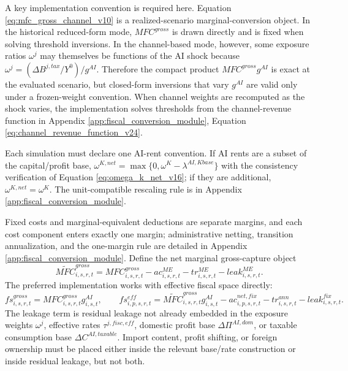 \documentclass[11pt,a4paper]{article}
\begin{document}
A key implementation convention is required here. Equation \eqref{eq:mfc_gross_channel_v10} is a realized-scenario marginal-conversion object. In the historical reduced-form mode, $MFC^{gross}$ is drawn directly and is fixed when solving threshold inversions. In the channel-based mode, however, some exposure ratios $\omega^j$ may themselves be functions of the AI shock because $\omega^j=(\Delta B^{j,tax}/Y^0)/g^{AI}$. Therefore the compact product $MFC^{gross}g^{AI}$ is exact at the evaluated scenario, but closed-form inversions that vary $g^{AI}$ are valid only under a frozen-weight convention. When channel weights are recomputed as the shock varies, the implementation solves thresholds from the channel-revenue function in Appendix \ref{app:fiscal_conversion_module}, Equation \eqref{eq:channel_revenue_function_v24}.

Each simulation must declare one AI-rent convention. If AI rents are a subset of the capital/profit base, $\omega^{K,net}=\max\{0,\omega^K-\lambda^{AI,Kbase}\}$ with the consistency verification of Equation \eqref{eq:omega_k_net_v16}; if they are additional, $\omega^{K,net}=\omega^K$. The unit-compatible rescaling rule is in Appendix \ref{app:fiscal_conversion_module}.

Fixed costs and marginal-equivalent deductions are separate margins, and each cost component enters exactly one margin; administrative netting, transition annualization, and the one-margin rule are detailed in Appendix \ref{app:fiscal_conversion_module}. Define the net marginal gross-capture object
\begin{equation}\label{eq:mfc_tilde_v17}
    \widetilde{MFC}^{gross}_{i,s,r,t}
    =MFC^{gross}_{i,s,r,t}-ac^{ME}_{i,s,r,t}-tr^{ME}_{i,s,r,t}-leak^{ME}_{i,s,r,t}.
\end{equation}
The preferred implementation works with effective fiscal space directly:
\begin{equation}\label{eq:fs_gross_eff_v21}
    fs^{gross}_{i,s,r,t}=MFC^{gross}_{i,s,r,t}g^{AI}_{i,s,t},
    \qquad
    fs^{eff}_{i,p,s,r,t}=\widetilde{MFC}^{gross}_{i,s,r,t}g^{AI}_{i,s,t}
    -ac^{net,fix}_{i,p,s,r,t}-tr^{ann}_{i,s,r,t}-leak^{fix}_{i,s,r,t}.
\end{equation}
The leakage term is residual leakage not already embedded in the exposure weights $\omega^j$, effective rates $\tau^{j,fisc,eff}$, domestic profit base $\Delta\Pi^{AI,dom}$, or taxable consumption base $\Delta C^{AI,taxable}$. Import content, profit shifting, or foreign ownership must be placed either inside the relevant base/rate construction or inside residual leakage, but not both.
\end{document}
